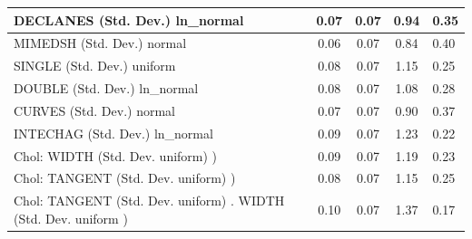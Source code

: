 \begin{table}
\begin{center}
\begin{tabular}{|l|l|c|c|c|l|}
			\hline
			DECLANES (Std. Dev.) ln_normal &  & 0.07 & 0.07 & 0.94 & 0.35 \\
			\hline
			MIMEDSH (Std. Dev.) normal &  & 0.06 & 0.07 & 0.84 & 0.40 \\
			\hline
			SINGLE (Std. Dev.) uniform &  & 0.08 & 0.07 & 1.15 & 0.25 \\
			\hline
			DOUBLE (Std. Dev.) ln_normal &  & 0.08 & 0.07 & 1.08 & 0.28 \\
			\hline
			CURVES (Std. Dev.) normal &  & 0.07 & 0.07 & 0.90 & 0.37 \\
			\hline
			INTECHAG (Std. Dev.) ln_normal &  & 0.09 & 0.07 & 1.23 & 0.22 \\
			\hline
			 Chol: WIDTH (Std. Dev. uniform) ) &  & 0.09 & 0.07 & 1.19 & 0.23 \\
			\hline
			 Chol: TANGENT (Std. Dev. uniform) ) &  & 0.08 & 0.07 & 1.15 & 0.25 \\
			\hline
			 Chol: TANGENT (Std. Dev. uniform) . WIDTH (Std. Dev.   uniform ) &  & 0.10 & 0.07 & 1.37 & 0.17 \\
			\hline
		\end{tabular}
	\end{center}
\end{table}
